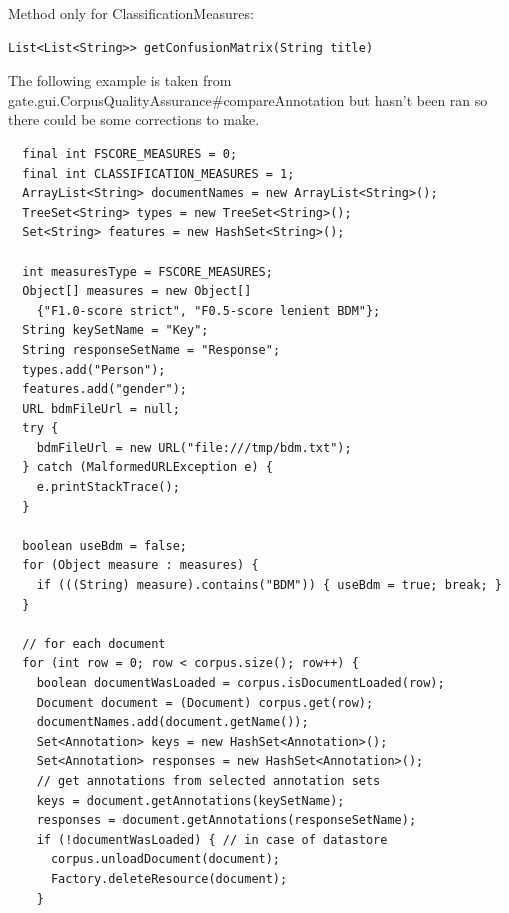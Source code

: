 Method only for ClassificationMeasures:
\begin{small}\begin{verbatim}
List<List<String>> getConfusionMatrix(String title)
\end{verbatim}\end{small}

The following example is taken from
{gate.gui.CorpusQualityAssurance\#compareAnnotation} but hasn't been ran so
there could be some corrections to make.

\begin{lstlisting}
  final int FSCORE_MEASURES = 0;
  final int CLASSIFICATION_MEASURES = 1;
  ArrayList<String> documentNames = new ArrayList<String>();
  TreeSet<String> types = new TreeSet<String>();
  Set<String> features = new HashSet<String>();

  int measuresType = FSCORE_MEASURES;
  Object[] measures = new Object[]
    {"F1.0-score strict", "F0.5-score lenient BDM"};
  String keySetName = "Key";
  String responseSetName = "Response";
  types.add("Person");
  features.add("gender");
  URL bdmFileUrl = null;
  try {
    bdmFileUrl = new URL("file:///tmp/bdm.txt");
  } catch (MalformedURLException e) {
    e.printStackTrace();
  }

  boolean useBdm = false;
  for (Object measure : measures) {
    if (((String) measure).contains("BDM")) { useBdm = true; break; }
  }

  // for each document
  for (int row = 0; row < corpus.size(); row++) {
    boolean documentWasLoaded = corpus.isDocumentLoaded(row);
    Document document = (Document) corpus.get(row);
    documentNames.add(document.getName());
    Set<Annotation> keys = new HashSet<Annotation>();
    Set<Annotation> responses = new HashSet<Annotation>();
    // get annotations from selected annotation sets
    keys = document.getAnnotations(keySetName);
    responses = document.getAnnotations(responseSetName);
    if (!documentWasLoaded) { // in case of datastore
      corpus.unloadDocument(document);
      Factory.deleteResource(document);
    }


\end{lstlisting}
